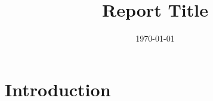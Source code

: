 \documentclass[12pt]{article}
\title{Report Title}
\author{}
\date{\today}
\numberwithin{equation}{section}
\begin{document}




\setcounter{tocdepth}{2}
\tableofcontents{}
\pagebreak



\section{Introduction} \label{sec:intro}

\end{document}
